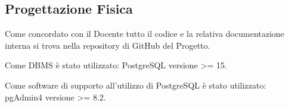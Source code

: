 \subsection{Progettazione Fisica}

Come concordato con il Docente tutto il codice e la relativa documentazione interna si trova
nella repository di GitHub del Progetto.

Come DBMS è stato utilizzato: PostgreSQL versione >= 15.

Come software di supporto all'utilizzo di PostgreSQL è stato utilizzato: pgAdmin4 versione >= 8.2.


